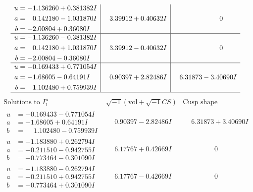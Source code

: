\documentclass[1p]{elsarticle_modified}
\theoremstyle{definition}
\newcommand{\I}{\sqrt{-1}}
\begin{document}
$$\begin{array}{c|c|c}
\begin{aligned}
u &= -1.136260 + 0.381382 I \\
a &= \phantom{-}0.142180 - 1.031870 I \\
b &= -2.00804 + 0.36080 I\end{aligned}
 & \phantom{-}3.39912 + 0.40632 I & \phantom{-0.000000 } 0 \\ \hline\begin{aligned}
u &= -1.136260 - 0.381382 I \\
a &= \phantom{-}0.142180 + 1.031870 I \\
b &= -2.00804 - 0.36080 I\end{aligned}
 & \phantom{-}3.39912 - 0.40632 I & \phantom{-0.000000 } 0 \\ \hline\begin{aligned}
u &= -0.169433 + 0.771054 I \\
a &= -1.68605 - 0.64191 I \\
b &= \phantom{-}1.102480 + 0.759939 I\end{aligned}
 & \phantom{-}0.90397 + 2.82486 I & \phantom{-}6.31873 - 3.40690 I\\
 \hline 
 \end{array}$$\newpage$$\begin{array}{c|c|c}  
\text{Solutions to }I^u_{1}& \I (\text{vol} + \sqrt{-1}CS) & \text{Cusp shape}\\
 \hline 
\begin{aligned}
u &= -0.169433 - 0.771054 I \\
a &= -1.68605 + 0.64191 I \\
b &= \phantom{-}1.102480 - 0.759939 I\end{aligned}
 & \phantom{-}0.90397 - 2.82486 I & \phantom{-}6.31873 + 3.40690 I \\ \hline\begin{aligned}
u &= -1.183880 + 0.262794 I \\
a &= -0.211510 - 0.942755 I \\
b &= -0.773464 - 0.301090 I\end{aligned}
 & \phantom{-}6.17767 + 0.42669 I & \phantom{-0.000000 } 0 \\ \hline\begin{aligned}
u &= -1.183880 - 0.262794 I \\
a &= -0.211510 + 0.942755 I \\
b &= -0.773464 + 0.301090 I\end{aligned}
 & \phantom{-}6.17767 - 0.42669 I & \phantom{-0.000000 } 0 \\ \hline\begin{aligned}

\end{aligned}
\end{array}$$
\end{document}
